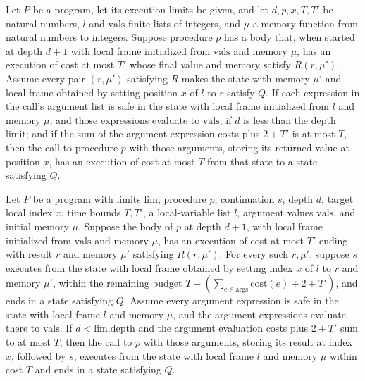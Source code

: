 \begin{theorem}
\label{Light.Ends.callTo}
\leanok
{}
Let $P$ be a program, let its execution limits be given, and let $d,p,x,T,T'$ be natural
numbers, $l$ and $\mathrm{vals}$ finite lists of integers, and $\mu$ a memory function
from natural numbers to integers. Suppose procedure $p$ has a body that, when started at
depth $d+1$ with local frame initialized from $\mathrm{vals}$ and memory $\mu$, has an
execution of cost at most $T'$ whose final value and memory satisfy $R(r,\mu')$. Assume
every pair $(r,\mu')$ satisfying $R$ makes the state with memory $\mu'$ and local frame
obtained by setting position $x$ of $l$ to $r$ satisfy $Q$. If each expression in the
call's argument list is safe in the state with local frame initialized from $l$ and
memory $\mu$, and those expressions evaluate to $\mathrm{vals}$; if $d$ is less than the
depth limit; and if the sum of the argument expression costs plus $2+T'$ is at most $T$,
then the call to procedure $p$ with those arguments, storing its returned value at
position $x$, has an execution of cost at most $T$ from that state to a state satisfying
$Q$.
\end{theorem}

\begin{theorem}
\label{Light.Ends.callToThen}
\leanok
{}
Let $P$ be a program with limits $\mathrm{lim}$, procedure $p$, continuation $s$, depth $d$,
target local index $x$, time bounds $T,T\prime$, a local-variable list $l$, argument
values $\mathrm{vals}$, and initial memory $\mu$. Suppose the body of $p$ at depth $d+1$,
with local frame initialized from $\mathrm{vals}$ and memory $\mu$, has an execution of
cost at most $T\prime$ ending with result $r$ and memory $\mu\prime$ satisfying
$R(r,\mu\prime)$. For every such $r,\mu\prime$, suppose $s$ executes from the state
with local frame obtained by setting index $x$ of $l$ to $r$ and memory $\mu\prime$,
within the remaining budget $T-(\sum_{e\in\mathrm{args}}\mathrm{cost}(e)+2+T\prime)$,
and ends in a state satisfying $Q$. Assume every argument expression is safe in the
state with local frame $l$ and memory $\mu$, and the argument expressions evaluate there
to $\mathrm{vals}$. If $d<\mathrm{lim.depth}$ and the argument evaluation costs plus
$2+T\prime$ sum to at most $T$, then the call to $p$ with those arguments, storing its
result at index $x$, followed by $s$, executes from the state with local frame $l$ and
memory $\mu$ within cost $T$ and ends in a state satisfying $Q$.
\end{theorem}
